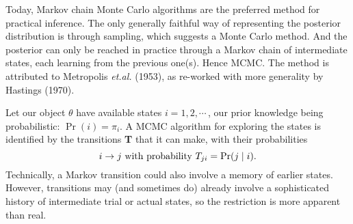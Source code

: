 Today, Markov chain Monte Carlo algorithms are the preferred method for practical inference.
The only generally faithful way of representing the posterior distribution is through sampling, which suggests a Monte Carlo method.
And the posterior can only be reached in practice through a Markov chain of intermediate states, each learning from the previous one(s).
Hence MCMC.
The method is attributed to Metropolis {\it et.al.} (1953), as re-worked with more generality by Hastings (1970).

Let our object $\theta$ have available states $i = 1,2,\cdots\,$, our prior knowledge being probabilistic: $\Pr(i) = \pi_i$.
A MCMC algorithm for exploring the states is identified by the transitions {\bf T} that it can make, with their probabilities
$$
    \hbox{$i \rightarrow j$ with probability $T_{ji} = \Pr( j \mid i )$}.
$$
Technically, a Markov transition could also involve a memory of earlier states.  
However, transitions may (and sometimes do) already involve a sophisticated history of intermediate trial or actual states, 
so the restriction is more apparent than real.

